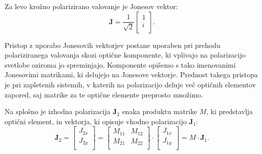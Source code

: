 Za levo krožno polarizirano valovanje je Jonesov
vektor:
\begin{equation}
\mathbf{J} = \frac{1}{\sqrt{2}}
\left[\begin{array}{c}
1\\
i\\
\end{array}\right]\!\!.
\label{eq:03_47}
\end{equation}

Pristop z uporabo Jonesovih vektorjev postane uporaben pri prehodu
polariziranega valovanja skozi optične komponente, ki vplivajo na 
polarizacijo svetlobe oziroma jo spreminjajo. Komponente opišemo s tako
imenovanimi Jonesovimi matrikami, ki delujejo na Jonesove vektorje. 
Prednost takega pristopa je pri zapletenih sistemih, v katerih
na polarizacijo deluje več optičnih elementov zapored, saj
matrike za te optične elemente preprosto množimo.

Na splošno je izhodna polarizacija $\mathbf{J}_2$ enaka produktu
matrike $M$, ki predstavlja optični element,
in vektorja, ki opisuje vhodno polarizacijo $\mathbf{J}_1$:
\begin{equation}
\mathbf{J}_2 = \left[\begin{array}{c}
J_{2x}\\
J_{2y}\\
\end{array}\right] = 
\left[\begin{array}{cc}
M_{11}& M_{12}\\
M_{21}& M_{22}\\
\end{array}\right]\cdot
\left[\begin{array}{c}
J_{1x}\\
J_{1y}\\
\end{array}\right] = M \cdot \mathbf{J}_1.
\label{eq:03_48}
\end{equation}

